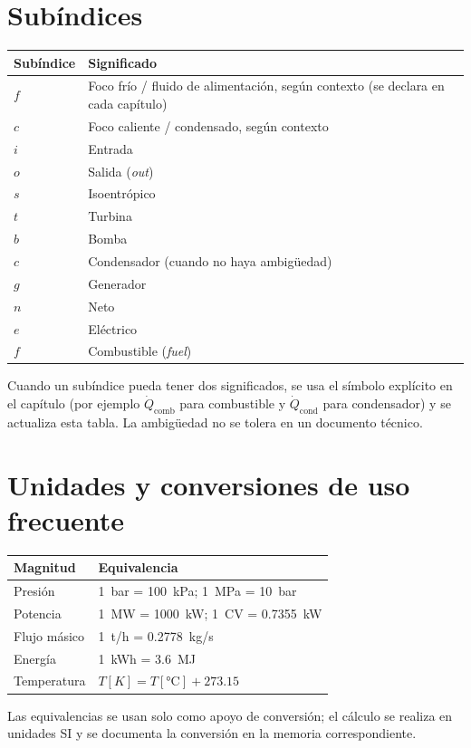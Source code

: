 \section{Subíndices}

\begin{longtable}{@{}p{2.4cm}p{9.4cm}@{}}
  \toprule
  \textbf{Subíndice} & \textbf{Significado} \\
  \midrule
  \endhead
  $f$        & Foco frío / fluido de alimentación, según contexto (se declara en cada capítulo) \\
  $c$        & Foco caliente / condensado, según contexto \\
  $i$        & Entrada \\
  $o$        & Salida (\textit{out}) \\
  $s$        & Isoentrópico \\
  $t$        & Turbina \\
  $b$        & Bomba \\
  $c$        & Condensador (cuando no haya ambigüedad) \\
  $g$        & Generador \\
  $n$        & Neto \\
  $e$        & Eléctrico \\
  $f$        & Combustible (\textit{fuel}) \\
  \bottomrule
\end{longtable}

\begin{cajanota}[title={Regla de desambiguación}]
Cuando un subíndice pueda tener dos significados, se usa el símbolo explícito en
el capítulo (por ejemplo $\dot Q_{\text{comb}}$ para combustible y
$\dot Q_{\text{cond}}$ para condensador) y se actualiza esta tabla. La
ambigüedad no se tolera en un documento técnico.
\end{cajanota}

\section{Unidades y conversiones de uso frecuente}

\begin{table}[H]
  \centering
  \small
  \begin{tabular}{@{}ll@{}}
    \toprule
    \textbf{Magnitud} & \textbf{Equivalencia} \\
    \midrule
    Presión & \qty{1}{bar} = \qty{100}{kPa}; \qty{1}{MPa} = \qty{10}{bar} \\
    Potencia & \qty{1}{MW} = \qty{1000}{kW}; \qty{1}{CV} = \qty{0.7355}{kW} \\
    Flujo másico & \qty{1}{t/h} = \qty{0.2778}{kg/s} \\
    Energía & \qty{1}{kWh} = \qty{3.6}{MJ} \\
    Temperatura & $T[\unit{K}] = T[\unit{\degreeCelsius}] + 273.15$ \\
    \bottomrule
  \end{tabular}
\end{table}

Las equivalencias se usan solo como apoyo de conversión; el cálculo se realiza en
unidades SI y se documenta la conversión en la memoria correspondiente.
